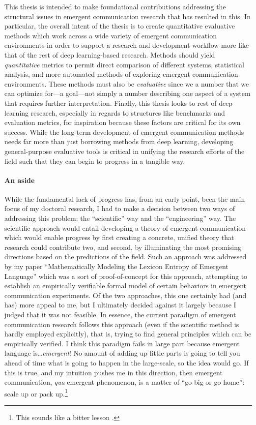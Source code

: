This thesis is intended to make foundational contributions addressing the structural issues in emergent communication research that has resulted in this.
In particular, the overall intent of the thesis is to create quantitative evaluative methods which work across a wide variety of emergent communication environments in order to support a research and development workflow more like that of the rest of deep learning-based research.
Methods should yield \emph{quantitative} metrics to permit direct comparison of different systems, statistical analysis, and more automated methods of exploring emergent communication environments.
These methods must also be \emph{evaluative} since we a number that we can optimize for---a goal---not simply a number describing one aspect of a system that requires further interpretation.
Finally, this thesis looks to rest of deep learning research, especially in regards to structures like benchmarks and evaluation metrics, for inspiration because these factors are critical for its own success.
While the long-term development of emergent communication methods needs far more than just borrowing methods from deep learning, developing general-purpose evaluative tools is critical in unifying the research efforts of the field such that they can begin to progress in a tangible way.

\paragraph{An aside}
While the fundamental lack of progress has, from an early point, been the main focus of my doctoral research, I had to make a decision between two ways of addressing this problem: the ``scientific'' way and the ``engineering'' way.
The scientific approach would entail developing a theory of emergent communication which would enable progress by first creating a concrete, unified theory that research could contribute two, and second, by illuminating the most promising directions based on the predictions of the field.
Such an approach was addressed by my paper ``Mathematically Modeling the Lexicon Entropy of Emergent Language'' \citep{boldt2022mathematically} which was a sort of proof-of-concept for this approach, attempting to establish an empirically verifiable formal model of certain behaviors in emergent communication experiments.
Of the two approaches, this one certainly had (and has) more appeal to me, but I ultimately decided against it largely because I judged that it was not feasible.
In essence, the current paradigm of emergent communication research follows this approach (even if the scientific method is hardly employed explicitly), that is, trying to find general principles which can be empirically verified.
I think this paradigm fails in large part because emergent language is\dots\emph{emergent}!
No amount of adding up little parts is going to tell you ahead of time what is going to happen in the large-scale, so the idea would go.
If this is true, and my intuition pushes me in this direction, then emergent communication, \emph{qua} emergent phenomenon, is a matter of ``go big or go home'': scale up or pack up.\footnote{This sounds like a bitter lesson \citep{bitter-lesson}.}

